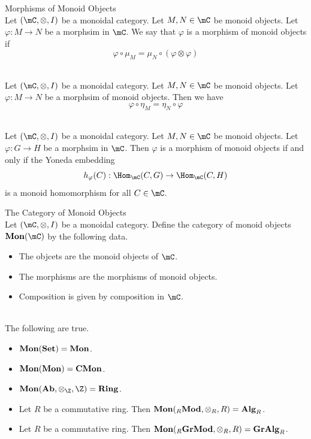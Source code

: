 \documentclass[a4paper]{article}
\begin{document}
\begin{defn}{Morphisms of Monoid Objects}{}\\
Let $(\mC,\otimes,I)$ be a monoidal category. Let $M,N\in\mC$ be monoid objects. Let $\varphi:M\to N$ be a morphsim in $\mC$. We say that $\varphi$ is a morphism of monoid objects if $$\varphi\circ\mu_M=\mu_N\circ(\varphi\otimes\varphi)$$
\end{defn}

\begin{lmm}{}{}\\
Let $(\mC,\otimes,I)$ be a monoidal category. Let $M,N\in\mC$ be monoid objects. Let $\varphi:M\to N$ be a morphsim of monoid objects. Then we have $$\varphi\circ\eta_M=\eta_N\circ\varphi$$
\end{lmm}

\begin{prp}{}{}\\
Let $(\mC,\otimes,I)$ be a monoidal category. Let $M,N\in\mC$ be monoid objects. Let $\varphi:G\to H$ be a morphsim in $\mC$. Then $\varphi$ is a morphism of monoid objects if and only if the Yoneda embedding $$h_\varphi(C):\Hom_\mC(C,G)\to\Hom_\mC(C,H)$$ is a  monoid homomorphism for all $C\in\mC$. 
\end{prp}

\begin{defn}{The Category of Monoid Objects}{}\\
Let $(\mC,\otimes,I)$ be a monoidal category. Define the category of monoid objects $\bold{Mon}(\mC)$ by the following data. 
\begin{itemize}
\item The objcets are the monoid objects of $\mC$. 
\item The morphisms are the morphisms of monoid objects. 
\item Composition is given by composition in $\mC$. 
\end{itemize}
\end{defn}

\begin{eg}{}{}\\
The following are true. 
\begin{itemize}
\item $\bold{Mon}(\bold{Set})=\bold{Mon}$. 
\item $\bold{Mon}(\bold{Mon})=\bold{CMon}$. 
\item $\bold{Mon}(\bold{Ab},\otimes_\Z,\Z)=\bold{Ring}$. 
\item Let $R$ be a commutative ring. Then $\bold{Mon}({_R}\bold{Mod},\otimes_R,R)=\bold{Alg}_R$. 
\item Let $R$ be a commutative ring. Then $\bold{Mon}({_R}\bold{GrMod},\otimes_R,R)=\bold{GrAlg}_R$. 
\end{itemize}
\end{eg}
\end{document}
